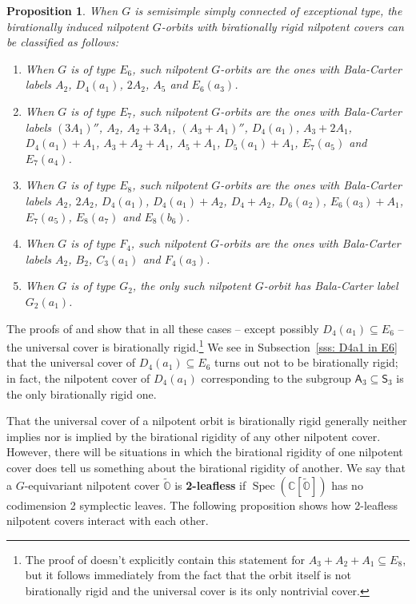 \documentclass[11pt]{amsart}
\newcommand{\C}{{\mathbb C}}
\renewcommand{\O}{{\mathbb O}}
\newcommand{\Spec}{\operatorname{Spec}}
\newcommand{\Alt}{{\mathsf{A}}}
\newcommand{\Sym}{{\mathsf{S}}}
\newcommand{\covO}{\widetilde{\O}}
\newtheorem{prop}[theorem]{Proposition}
\numberwithin{equation}{section}
\begin{document}
	\begin{prop}\label{p: bsr}
		When $G$ is semisimple simply connected of exceptional type, the birationally induced nilpotent $G$-orbits with birationally rigid nilpotent covers can be classified as follows:
		\begin{enumerate}
			\item When $G$ is of type $E_6$, such nilpotent $G$-orbits are the ones with Bala-Carter labels $A_2$, $D_4(a_1)$, $2A_2$, $A_5$ and $E_6(a_3)$.
			\item When $G$ is of type $E_7$, such nilpotent $G$-orbits are the ones with Bala-Carter labels $(3A_1)''$, $A_2$, $A_2+3A_1$, $(A_3+A_1)''$, $D_4(a_1)$, $A_3+2A_1$, $D_4(a_1)+A_1$, $A_3+A_2+A_1$, $A_5+A_1$, $D_5(a_1)+A_1$, $E_7(a_5)$ and $E_7(a_4)$.
			\item When $G$ is of type $E_8$, such nilpotent $G$-orbits are the ones with Bala-Carter labels $A_2$, $2A_2$, $D_4(a_1)$, $D_4(a_1)+A_2$, $D_4+A_2$, $D_6(a_2)$, $E_6(a_3)+A_1$, $E_7(a_5)$, $E_8(a_7)$ and $E_8(b_6)$.
			\item When $G$ is of type $F_4$, such nilpotent $G$-orbits are the ones with Bala-Carter labels $A_2$, $B_2$, $C_3(a_1)$ and $F_4(a_3)$.
			\item When $G$ is of type $G_2$, the only such nilpotent $G$-orbit has Bala-Carter label $G_2(a_1)$.
		\end{enumerate}
	\end{prop}
	
	The proofs of \cite[Proposition 7.6.16]{LMM} and \cite[Proposition 3.9.5]{MM} show that in all these cases -- except possibly $D_4(a_1)\subseteq E_6$ -- the universal cover is birationally rigid.\footnote{The proof of \cite[Proposition 3.9.5]{MM} doesn't explicitly contain this statement for $A_3+A_2+A_1\subseteq E_8$, but it follows immediately from the fact that the orbit itself is not birationally rigid and the universal cover is its only nontrivial cover.} We see in Subsection~\ref{sss: D4a1 in E6} that the universal cover of $D_4(a_1)\subseteq E_6$ turns out not to be birationally rigid; in fact, the nilpotent cover of $D_4(a_1)$ corresponding to the subgroup $\Alt_3\subseteq \Sym_3$ is the only birationally rigid one.
	
	That the universal cover of a nilpotent orbit is birationally rigid generally neither implies nor is implied by the birational rigidity of any other nilpotent cover. However, there will be situations in which the birational rigidity of one nilpotent cover does tell us something about the birational rigidity of another. We say that a $G$-equivariant nilpotent cover $\covO$ is {\bf 2-leafless} if $\Spec(\C[\covO])$ has no codimension 2 symplectic leaves. The following proposition shows how 2-leafless nilpotent covers interact with each other.
	
\end{document}
